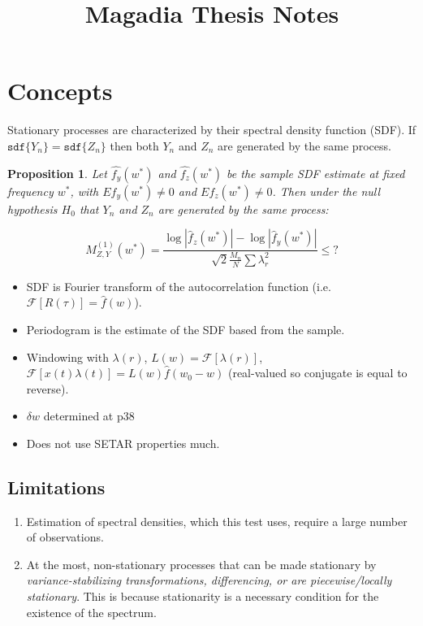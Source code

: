 \documentclass{article}
\title{Magadia Thesis Notes}
\newtheorem{proposition}{Proposition}
\newcommand{\Fourier}{\boldsymbol{\mathcal{F}}}
\begin{document}
\section{Concepts}
Stationary processes are characterized by their spectral density function
(SDF). If $\texttt{sdf}\{Y_{n}\} = \texttt{sdf}\{Z_{n}\}$ then both $Y_{n}$ and
$Z_{n}$ are generated by the same process.

\begin{proposition}
Let $\hat{f_{y}}(w^{*})$ and $\hat{f_{z}}(w^{*})$ be the sample SDF estimate at
fixed frequency $w^{*}$, with $E f_{y}(w^{*}) \neq 0$ and $E f_{z}(w^{*}) \neq
0$. Then under the null hypothesis $H_{0}$ that $Y_{n}$ and $Z_{n}$ are
generated by the same process: 

\[ M_{Z,Y}^{(1)}(w^{*}) = \frac{\log |\hat{f}_{z}(w^{*})| - \log
|\hat{f}_{y}(w^{*})|}{\sqrt{2} \frac{M_{n}}{N} \sum \lambda_{r}^{2}} \leq ? \]
\end{proposition}


\begin{itemize}
\item SDF is Fourier transform of the autocorrelation function
(i.e. $\Fourier [R(\tau)] = \hat{f}(w)$).
\item Periodogram is the estimate of the SDF based from the sample.
\item Windowing with $\lambda(r)$, $L(w) = \Fourier [\lambda(r)]$, $\Fourier
[x(t) \lambda(t)] = L(w) \hat{f}(w_{0} - w)$ (real-valued so conjugate is equal
to reverse).
\item $\delta w$ determined at p38
\item Does not use SETAR properties much.
\end{itemize}

\subsection{Limitations}
\begin{enumerate}
\item Estimation of spectral densities, which this test uses, require a large 
number of observations.
\item At the most, non-stationary processes that can be made stationary
by \emph{variance-stabilizing transformations, differencing, or are
piecewise/locally stationary}. This is because stationarity is a necessary 
condition for the existence of the spectrum.
\end{enumerate}
\end{document}
